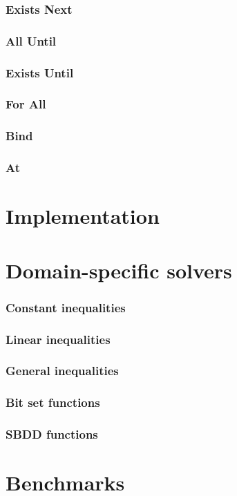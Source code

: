 	\subsection{Exists Next}
	\subsection{All Until}
	\subsection{Exists Until}
	\subsection{For All}
	\subsection{Bind}
	\subsection{At}

\chapter{Implementation}

\chapter{Domain-specific solvers}
	\subsection{Constant inequalities}
	\subsection{Linear inequalities}
	\subsection{General inequalities}
	\subsection{Bit set functions}
	\subsection{SBDD functions}

\chapter{Benchmarks}
